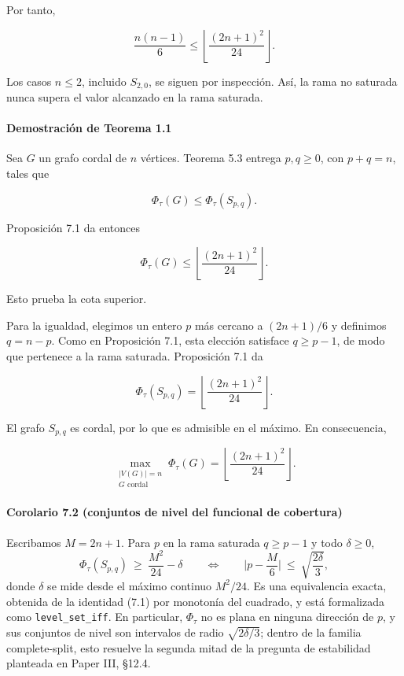 \documentclass[
  spanish,
  11pt,
  a4paper,
]{article}
\begin{document}
Por tanto,

\[
\frac{n(n-1)}6
\le
\left\lfloor\frac{(2n+1)^2}{24}\right\rfloor.
\]

Los casos \(n\le2\), incluido \(S_{2,0}\), se siguen por inspección. Así, la rama no saturada nunca supera el valor alcanzado en la rama saturada.

\paragraph{Demostración de Teorema 1.1}\label{demostraciuxf3n-de-teorema-1.1}

Sea \(G\) un grafo cordal de \(n\) vértices. Teorema 5.3 entrega \(p,q\ge0\), con \(p+q=n\), tales que

\[
\Phi_\tau(G)\le\Phi_\tau(S_{p,q}).
\]

Proposición 7.1 da entonces

\[
\Phi_\tau(G)
\le
\left\lfloor\frac{(2n+1)^2}{24}\right\rfloor.
\]

Esto prueba la cota superior.

Para la igualdad, elegimos un entero \(p\) más cercano a \((2n+1)/6\) y definimos \(q=n-p\). Como en Proposición 7.1, esta elección satisface \(q\ge p-1\), de modo que pertenece a la rama saturada. Proposición 7.1 da

\[
\Phi_\tau(S_{p,q})
=
\left\lfloor\frac{(2n+1)^2}{24}\right\rfloor.
\]

El grafo \(S_{p,q}\) es cordal, por lo que es admisible en el máximo. En consecuencia,

\[
\max_{\substack{|V(G)|=n\\G\text{ cordal}}}
\Phi_\tau(G)
=
\left\lfloor\frac{(2n+1)^2}{24}\right\rfloor.
\]

\paragraph{Corolario 7.2 (conjuntos de nivel del funcional de cobertura)}\label{corolario-7.2-conjuntos-de-nivel-del-funcional-de-cobertura}

Escribamos \(M=2n+1\). Para \(p\) en la rama saturada \(q\ge p-1\) y todo \(\delta\ge0\),
\[
\Phi_\tau(S_{p,q})\ \ge\ \frac{M^2}{24}-\delta\qquad\Longleftrightarrow\qquad \Big|p-\frac{M}{6}\Big|\ \le\ \sqrt{\frac{2\delta}{3}},
\]
donde \(\delta\) se mide desde el máximo continuo \(M^2/24\). Es una equivalencia exacta, obtenida de la identidad (7.1) por monotonía del cuadrado, y está formalizada como \texttt{level\_set\_iff}. En particular, \(\Phi_\tau\) no es plana en ninguna dirección de \(p\), y sus conjuntos de nivel son intervalos de radio \(\sqrt{2\delta/3}\); dentro de la familia complete-split, esto resuelve la segunda mitad de la pregunta de estabilidad planteada en Paper III, §12.4.
\end{document}
